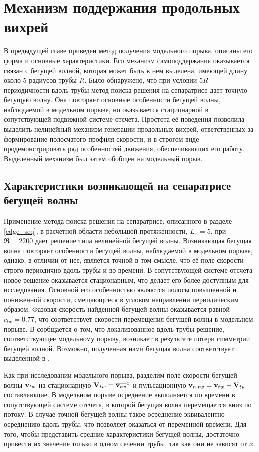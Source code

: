 
\chapter{Механизм поддержания продольных вихрей}


В предыдущей главе приведен метод получения модельного порыва, описаны его форма и основные характеристики. Его механизм самоподдержания оказывается связан с бегущей волной, которая может быть в нем выделена, имеющей длину около 5 радиусов трубы $R$. Было обнаружено, что при условии $5R$ периодичности вдоль трубы метод поиска решения на сепаратрисе дает точную бегущую волну. Она повторяет основные особенности бегущей волны, наблюдаемой в модельном порыве, но оказывается стационарной в сопутствующей подвижной системе отсчета. Простота её поведения позволила выделить нелинейный механизм генерации продольных вихрей, ответственных за формирование полосчатого профиля скорости, и в строгом виде продемонстрировать ряд особенностей движения, обеспечивающих его работу. Выделенный механизм был затем обобщен на модельный порыв. 



\section{Характеристики возникающей на сепаратрисе бегущей волны}

Применение метода поиска решения на сепаратрисе, описанного в разделе \ref{edge_seq}, в расчетной области небольшой протяженности, $L_x = 5$, при $\Re = 2200$ дает решение типа нелинейной бегущей волны. Возникающая бегущая волна повторяет особенности бегущей волны, наблюдаемой в модельном порыве, однако, в отличии от нее, является точной в том смысле, что её поле скорости строго периодично вдоль трубы и во времени. В сопутствующей системе отсчета новое решение оказывается стационарным, что делает его более доступным для исследования. Основной его особенностью являются полосы повышенной и пониженной скорости, смещающиеся в угловом направлении периодическим образом. Фазовая скорость найденной бегущей волны оказывается равной $c_{tw} = 0.77$, что соответствует скорости перемещения бегущей волны в модельном порыве. В \cite{Chantry2014} сообщается о том, что локализованное вдоль трубы решение, соответствующее модельному порыву, возникает в результате потери симметрии бегущей волной. Возможно, полученная нами бегущая волна соответствует выделенной в \cite{Chantry2014}. 

Как при исследовании модельного порыва, разделим поле скорости бегущей волны $\mathbf{v}_{tw}$ на стационарную $\mathbf{V}_{tw} = \overline{\mathbf{v}_{tw}}^{x}$ и пульсационную $\mathbf{v}_{n,tw} = \mathbf{v}_{tw} - \mathbf{V}_{tw}$ составляющие. В модельном порыве осреднение выполняется по времени в сопутствующей системе отсчета, в которой бегущая волна перемещается вниз по потоку. В случае точной бегущей волны такое осреднение эквивалентно осреднению вдоль трубы, что позволяет оказаться от переменной времени. Для того, чтобы представить средние характеристики бегущей волны, достаточно привести их значение только в одном сечении трубы, так как они не зависят от $x$.

